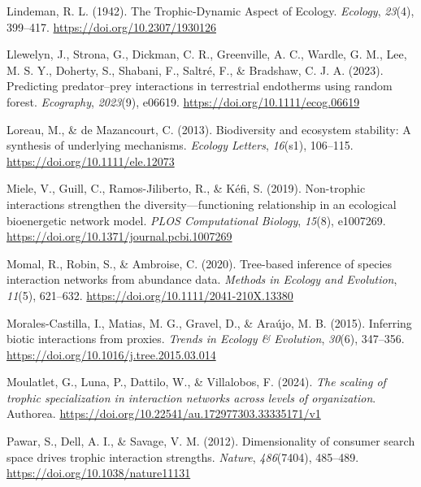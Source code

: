 \documentclass[
]{article}
\newlength{\cslhangindent}
\newenvironment{CSLReferences}[2] %
 {\begin{list}{}{%
  \setlength{\itemindent}{0pt}
  \setlength{\leftmargin}{0pt}
  \setlength{\parsep}{0pt}
  \ifodd #1
   \setlength{\leftmargin}{\cslhangindent}
   \setlength{\itemindent}{-1\cslhangindent}
  \fi
  \setlength{\itemsep}{#2\baselineskip}}}
 {\end{list}}
\begin{document}
\begin{CSLReferences}{1}{0}
Lindeman, R. L. (1942). The {Trophic-Dynamic Aspect} of {Ecology}.
\emph{Ecology}, \emph{23}(4), 399--417.
\url{https://doi.org/10.2307/1930126}

Llewelyn, J., Strona, G., Dickman, C. R., Greenville, A. C., Wardle, G.
M., Lee, M. S. Y., Doherty, S., Shabani, F., Saltré, F., \& Bradshaw, C.
J. A. (2023). Predicting predator--prey interactions in terrestrial
endotherms using random forest. \emph{Ecography}, \emph{2023}(9),
e06619. \url{https://doi.org/10.1111/ecog.06619}

Loreau, M., \& de Mazancourt, C. (2013). Biodiversity and ecosystem
stability: A synthesis of underlying mechanisms. \emph{Ecology Letters},
\emph{16}(s1), 106--115. \url{https://doi.org/10.1111/ele.12073}

Miele, V., Guill, C., Ramos-Jiliberto, R., \& Kéfi, S. (2019).
Non-trophic interactions strengthen the diversity---functioning
relationship in an ecological bioenergetic network model. \emph{PLOS
Computational Biology}, \emph{15}(8), e1007269.
\url{https://doi.org/10.1371/journal.pcbi.1007269}

Momal, R., Robin, S., \& Ambroise, C. (2020). Tree-based inference of
species interaction networks from abundance data. \emph{Methods in
Ecology and Evolution}, \emph{11}(5), 621--632.
\url{https://doi.org/10.1111/2041-210X.13380}

Morales-Castilla, I., Matias, M. G., Gravel, D., \& Araújo, M. B.
(2015). Inferring biotic interactions from proxies. \emph{Trends in
Ecology \& Evolution}, \emph{30}(6), 347--356.
\url{https://doi.org/10.1016/j.tree.2015.03.014}

Moulatlet, G., Luna, P., Dattilo, W., \& Villalobos, F. (2024).
\emph{The scaling of trophic specialization in interaction networks
across levels of organization}. Authorea.
\url{https://doi.org/10.22541/au.172977303.33335171/v1}

Pawar, S., Dell, A. I., \& Savage, V. M. (2012). Dimensionality of
consumer search space drives trophic interaction strengths.
\emph{Nature}, \emph{486}(7404), 485--489.
\url{https://doi.org/10.1038/nature11131}


\end{CSLReferences}
\end{document}
